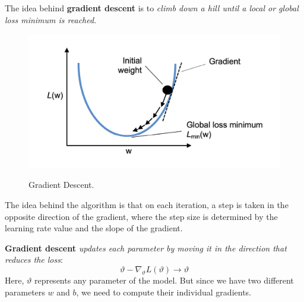 \documentclass[../machine_learning_scikit.tex]{subfiles}
\begin{document}
    \begin{idea}
        The idea behind \textbf{gradient descent} is to \textit{climb down a hill until a local or global loss minimum is reached}.
    \end{idea}

    \begin{figure}[h]
        \begin{minipage}{\textwidth}
            \centering
            \includegraphics[scale=1]{images/gradient_descent.png} \\
            \caption{Gradient Descent.}
            \label{figure:gradient_descent}
        \end{minipage}
    \end{figure}

    The idea behind the algorithm is that on each iteration, a step is taken in the opposite direction of the gradient, where the step size is determined by the learning rate value and the slope of the gradient.

    \begin{obs}
        \textbf{Gradient descent} \textit{updates each parameter by moving it in the direction that reduces the loss}:
        \begin{equation*}
            \vartheta-\nabla_{\vartheta}L(\vartheta)\rightarrow\vartheta
        \end{equation*}
        Here, $\vartheta$ represents any parameter of the model. But since we have two different parameters $w$ and $b$, we need to compute their individual gradients.
    \end{obs}
\end{document}
